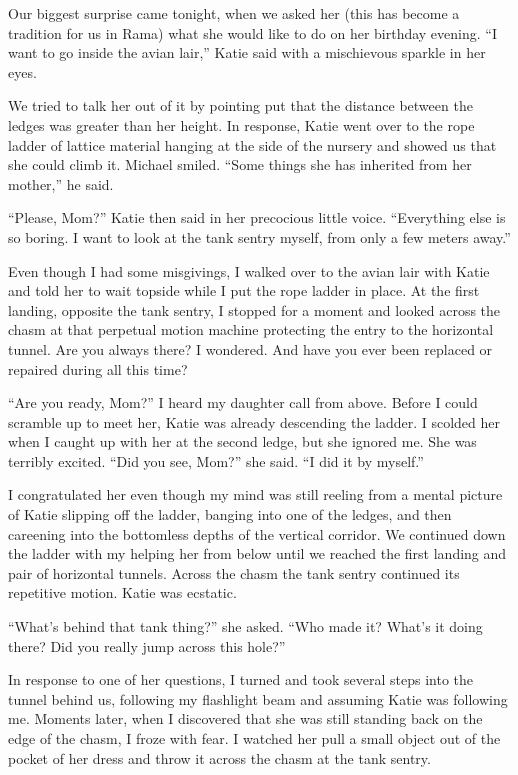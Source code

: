 \documentclass[]{article}
\begin{document}
Our biggest surprise came tonight, when we asked her (this has become a tradition for us in Rama) what she would like to do on her birthday evening.  “I want to go inside the avian lair,” Katie said with a mischievous sparkle in her eyes.

We tried to talk her out of it by pointing put that the distance between the ledges was greater than her height.  In response, Katie went over to the rope ladder of lattice material hanging at the side of the nursery and showed us that she could climb it.  Michael smiled.  “Some things she has inherited from her mother,” he said.

“Please, Mom?” Katie then said in her precocious little voice.  “Everything else is so boring.  I want to look at the tank sentry myself, from only a few meters away.”

Even though I had some misgivings, I walked over to the avian lair with Katie and told her to wait topside while I put the rope ladder in place.  At the first landing, opposite the tank sentry, I stopped for a moment and looked across the chasm at that perpetual motion machine protecting the entry to the horizontal tunnel.  Are you always there? I wondered.  And have you ever been replaced or repaired during all this time?

“Are you ready, Mom?” I heard my daughter call from above.  Before I could scramble up to meet her, Katie was already descending the ladder.  I scolded her when I caught up with her at the second ledge, but she ignored me.  She was terribly excited.  “Did you see, Mom?” she said.  “I did it by myself.”

I congratulated her even though my mind was still reeling from a mental picture of Katie slipping off the ladder, banging into one of the ledges, and then careening into the bottomless depths of the vertical corridor.  We continued down the ladder with my helping her from below until we reached the first landing and pair of horizontal tunnels.  Across the chasm the tank sentry continued its repetitive motion.  Katie was ecstatic.

“What’s behind that tank thing?” she asked.  “Who made it? What’s it doing there? Did you really jump across this hole?”

In response to one of her questions, I turned and took several steps into the tunnel behind us, following my flashlight beam and assuming Katie was following me.  Moments later, when I discovered that she was still standing back on the edge of the chasm, I froze with fear.  I watched her pull a small object out of the pocket of her dress and throw it across the chasm at the tank sentry.
\end{document}
